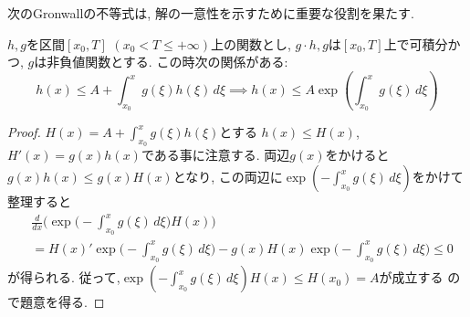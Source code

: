 \documentclass[12pt,xelatex,ja=standard]{bxjsarticle}
\begin{document}
次のGronwallの不等式は,
解の一意性を示すために重要な役割を果たす.
\begin{Lemma}[Gronwallの不等式]
$h,g$を区間$[x_{0},T]$ $(x_{0}<T\leq +\infty)$上の関数とし,
$g\cdot h,g$は$[x_0,T]$上で可積分かつ,
$g$は非負値関数とする.
この時次の関係がある:
	\[
	h(x) \leq A + \int_{x_0}^x g(\xi) h(\xi) \, d\xi \implies
	h(x) \leq A \exp\left(\int_{x_0}^x g(\xi) \, d\xi\right)
	\]
\end{Lemma}

\begin{proof}
$H(x)=A+\int_{x_0}^x g(\xi) h(\xi)$とする
$h(x)\leq H(x)$, $H'(x)=g(x)h(x)$である事に注意する.
両辺$g(x)$をかけると$g(x)h(x)\leq g(x)H(x)$となり,
この両辺に$\exp\left(-\int_{x_0}^x g(\xi) \, d\xi\right)$をかけて整理すると
	\begin{align*}
	&\frac{d}{dx} \bigg( \exp \bigg( -\int_{x_0}^x g(\xi) \, d\xi \bigg) H(x)\bigg)\\
	&=H(x)' \exp \bigg( -\int_{x_0}^x g(\xi) \, d\xi \bigg)
	-g(x)H(x) \exp \bigg( - \int_{x_0}^x g(\xi) \, d\xi \bigg)
	\leq 0
	\end{align*}
が得られる.
従って,$\exp(-\int_{x_0}^x g(\xi) \, d\xi)H(x) \leq H(x_{0})=A$が成立する
ので題意を得る.
\end{proof}
\end{document}
